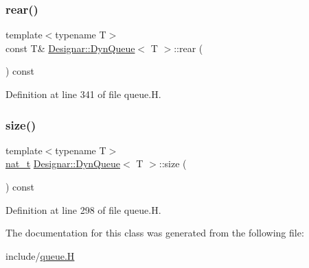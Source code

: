 \subsubsection{\texorpdfstring{rear()}{rear()}\hspace{0.1cm}{\footnotesize\ttfamily [2/2]}}
{\footnotesize\ttfamily template$<$typename T$>$ \\
const T\& \hyperlink{class_designar_1_1_dyn_queue}{Designar\+::\+Dyn\+Queue}$<$ T $>$\+::rear (\begin{DoxyParamCaption}{ }\end{DoxyParamCaption}) const\hspace{0.3cm}{\ttfamily [inline]}}



Definition at line 341 of file queue.\+H.

\mbox{\label{class_designar_1_1_dyn_queue_a3fa0e8fd7d197de1a60caae23b5c305e}} 
\subsubsection{\texorpdfstring{size()}{size()}}
{\footnotesize\ttfamily template$<$typename T$>$ \\
\hyperlink{namespace_designar_aa72662848b9f4815e7bf31a7cf3e33d1}{nat\+\_\+t} \hyperlink{class_designar_1_1_dyn_queue}{Designar\+::\+Dyn\+Queue}$<$ T $>$\+::size (\begin{DoxyParamCaption}{ }\end{DoxyParamCaption}) const\hspace{0.3cm}{\ttfamily [inline]}}



Definition at line 298 of file queue.\+H.



The documentation for this class was generated from the following file\+:\begin{DoxyCompactItemize}
\item 
include/\hyperlink{queue_8_h}{queue.\+H}\end{DoxyCompactItemize}
